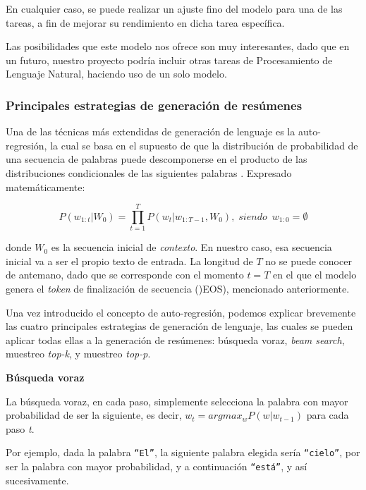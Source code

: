 
En cualquier caso, se puede realizar un ajuste fino del modelo para una de las tareas, a fin de mejorar su rendimiento en dicha tarea específica.

Las posibilidades que este modelo nos ofrece son muy interesantes, dado que en un futuro, nuestro proyecto podría incluir otras tareas de Procesamiento de Lenguaje Natural, haciendo uso de un solo modelo.


\bigskip
\subsubsection{Principales estrategias de generación de resúmenes}

Una de las técnicas más extendidas de generación de lenguaje es la auto-regresión, la cual se basa en el supuesto de que la distribución de probabilidad de una secuencia de palabras puede descomponerse en el producto de las distribuciones condicionales de las siguientes palabras \cite{platen20}. Expresado matemáticamente:

\[ P(w_{1:t} | W_0) = \prod_{t=1}^{T} P(w_t | w_{1:T-1}, W_0), \; siendo \enspace w_{1:0} = \emptyset \]

donde $W_0$ es la secuencia inicial de \emph{contexto}. En nuestro caso, esa secuencia inicial va a ser el propio texto de entrada. La longitud de $T$ no se puede conocer de antemano, dado que se corresponde con el momento $t = T$ en el que el modelo genera el \emph{token} de finalización de secuencia ()EOS), mencionado anteriormente.

Una vez introducido el concepto de auto-regresión, podemos explicar brevemente las cuatro principales estrategias de generación de lenguaje, las cuales se pueden aplicar todas ellas a la generación de resúmenes: búsqueda voraz, \emph{beam search}, muestreo \emph{top-k}, y muestreo \emph{top-p}.

\bigskip
\textbf{Búsqueda voraz}

La búsqueda voraz, en cada paso, simplemente selecciona la palabra con mayor probabilidad de ser la siguiente, es decir, $ w_t = argmax_w P(w|w_{t-1}) $ para cada paso \emph{t}.

Por ejemplo, dada la palabra \texttt{``El''}, la siguiente palabra elegida sería \texttt{``cielo''}, por ser la palabra con mayor probabilidad, y a continuación \texttt{``está''}, y así sucesivamente.

